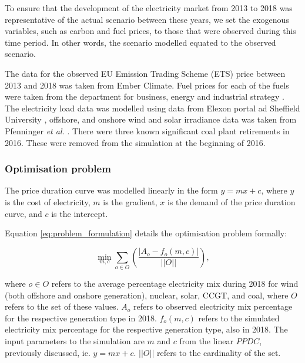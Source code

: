 To ensure that the development of the electricity market from 2013 to 2018 was representative of the actual scenario between these years, we set the exogenous variables, such as carbon and fuel prices, to those that were observed during this time period. In other words, the scenario modelled equated to the observed scenario. 

The data for the observed EU Emission Trading Scheme (ETS) price between 2013 and 2018 was taken from Ember Climate\cite{eu-ets}. Fuel prices for each of the fuels were taken from the department for business, energy and industrial strategy \cite{beis_fuel_price}. The electricity load data was modelled using data from Elexon portal ad Sheffield University \cite{gbnationalgridstatus2019}, offshore, and onshore wind and solar irradiance data was taken from Pfenninger \textit{et al.} \cite{Pfenninger2016}. There were three known significant coal plant retirements in 2016. These were removed from the simulation at the beginning of 2016.



\subsubsection{Optimisation problem}
\label{ssec:optimisation-problem}

The price duration curve was modelled linearly in the form $y=mx+c$, where $y$ is the cost of electricity, $m$ is the gradient, $x$ is the demand of the price duration curve, and $c$ is the intercept.

Equation \ref{eq:problem_formulation} details the optimisation problem formally:

\begin{equation}
\label{eq:problem_formulation}
\min_{m,c} \sum\limits_{o\in O}\left(
\frac{\left|A_o-f_o(m,c)\right|}
{\left|\left|O\right|\right|}
\right),
\end{equation}

\noindent where $o\in O$ refers to the average percentage electricity mix during 2018 for wind (both offshore and onshore generation), nuclear, solar, CCGT, and coal, where $O$ refers to the set of these values. $A_o$ refers to observed electricity mix percentage for the respective generation type in 2018. $f_o(m,c)$ refers to the simulated electricity mix percentage for the respective generation type, also in 2018. The input parameters to the simulation are $m$ and $c$ from the linear $PPDC$, previously discussed, ie. $y=mx+c$. $\left|\left|O\right|\right|$ refers to the cardinality of the set.



